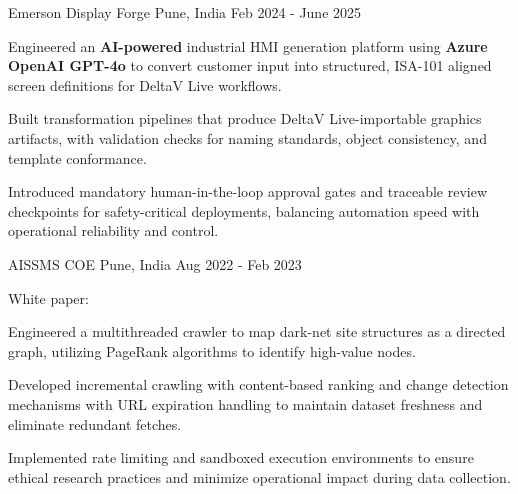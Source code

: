 \begin{cventries}
  \cventry
    {Emerson} %
    {Display Forge} %
    {Pune, India} %
    {Feb 2024 - June 2025} %
    {
      \begin{cvitems} %
        \item {Engineered an \textbf{AI-powered} industrial HMI generation platform using \textbf{Azure OpenAI GPT-4o} to convert customer input into structured, ISA-101 aligned screen definitions for DeltaV Live workflows.}
        \item {Built transformation pipelines that produce DeltaV Live-importable graphics artifacts, with validation checks for naming standards, object consistency, and template conformance.}
        \item {Introduced mandatory human-in-the-loop approval gates and traceable review checkpoints for safety-critical deployments, balancing automation speed with operational reliability and control.}
      \end{cvitems}
    }

    \cventry
    {AISSMS COE} %
    {} %
    {Pune, India} %
    {Aug 2022 - Feb 2023} %
    {
        \begin{cvitems} %
        \item {White paper: }
        \item {Engineered a multithreaded crawler to map dark-net site structures as a directed graph, utilizing PageRank algorithms to identify high-value nodes.}
        \item {Developed incremental crawling with content-based ranking and change detection mechanisms with URL expiration handling to maintain dataset freshness and eliminate redundant fetches.}
        \item {Implemented rate limiting and sandboxed execution environments to ensure ethical research practices and minimize operational impact during data collection.}
        \end{cvitems}
    }


\end{cventries}

